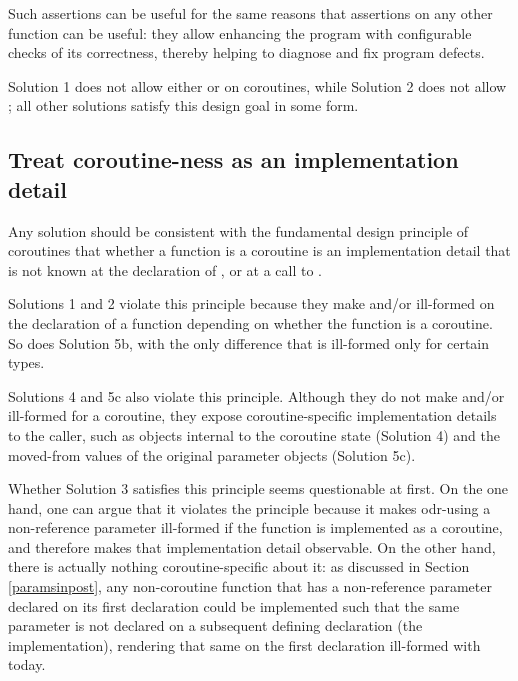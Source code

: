 Such assertions can be useful for the same reasons that assertions on any other function can be useful: they allow enhancing the program with configurable checks of its correctness, thereby helping to diagnose and fix program defects.

Solution 1 does not allow either  or  on coroutines, while Solution 2 does not allow ; all other solutions satisfy this design goal in some form.

\subsection{Treat coroutine-ness as an implementation detail}
\label{goal_coro_principle}

Any solution should be consistent with the fundamental design principle of coroutines that whether a function  is a coroutine is an implementation detail that is not known at the declaration of , or at a call to .

Solutions 1 and 2 violate this principle because they make  and/or  ill-formed on the declaration of a function depending on whether the function is a coroutine. So does Solution 5b, with the only difference that  is ill-formed only for certain types. 

Solutions 4 and 5c also violate this principle. Although they do not make  and/or  ill-formed for a coroutine, they expose coroutine-specific implementation details to the caller, such as objects internal to the coroutine state (Solution 4) and the moved-from values of the original parameter objects (Solution 5c).

Whether Solution 3 satisfies this principle seems questionable at first. On the one hand, one can argue that it violates the principle because it makes odr-using a  non-reference parameter ill-formed if the function is implemented as a coroutine, and therefore makes that implementation detail observable. On the other hand, there is actually nothing coroutine-specific about it: as discussed in Section \ref{paramsinpost}, any non-coroutine function that has a non-reference parameter declared  on its first declaration could be implemented such that the same parameter is not declared  on a subsequent defining declaration (the implementation), rendering that same  on the first declaration ill-formed with \cite{P2900R8} today.


